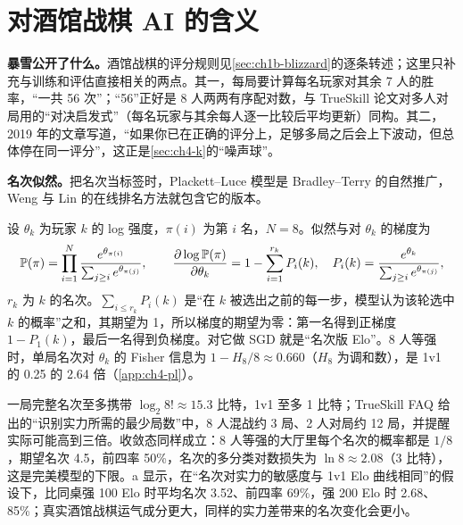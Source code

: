 \section{对酒馆战棋 AI 的含义}
\label{sec:ch4-bg}

\textbf{暴雪公开了什么。}酒馆战棋的评分规则见\cref{sec:ch1b-blizzard}的逐条转述；这里只补充与训练和评估直接相关的两点。其一，每局要计算每名玩家对其余 7 人的胜率，“一共 56 次”\cite{blizzard2019developer}\tagOff；“56”正好是 8 人两两有序配对数，与 TrueSkill 论文对多人对局用的“对决启发式”（每名玩家与其余每人逐一比较后平均更新）同构\cite{herbrich2006trueskill}\tagLit。其二，2019 年的文章写道，“如果你已在正确的评分上，足够多局之后会上下波动，但总体停在同一评分”\cite{blizzard2019developer}\tagOff，这正是\cref{sec:ch4-k}的“噪声球”。

\textbf{名次似然。}把名次当标签时，Plackett–Luce 模型\cite{plackett1975analysis}是 Bradley–Terry 的自然推广，Weng 与 Lin 的在线排名方法就包含它的版本\cite{weng2011bayesian}\tagLit。

\begin{derivbox}
设 $\theta_k$ 为玩家 $k$ 的 log 强度，$\pi(i)$ 为第 $i$ 名，$N=8$。似然与对 $\theta_k$ 的梯度为
\begin{equation}
\mathbb{P}(\pi)=\prod_{i=1}^{N}\frac{e^{\theta_{\pi(i)}}}{\sum_{j\ge i}e^{\theta_{\pi(j)}}},\qquad
\frac{\partial\log\mathbb{P}(\pi)}{\partial\theta_k}=1-\sum_{i=1}^{r_k}P_i(k),\quad P_i(k)=\frac{e^{\theta_k}}{\sum_{j\ge i}e^{\theta_{\pi(j)}}},
\label{eq:ch4-pl}
\end{equation}
$r_k$ 为 $k$ 的名次。$\sum_{i\le r_k}P_i(k)$ 是“在 $k$ 被选出之前的每一步，模型认为该轮选中 $k$ 的概率”之和，其期望为 1，所以梯度的期望为零：第一名得到正梯度 $1-P_1(k)$，最后一名得到负梯度。对它做 SGD 就是“名次版 Elo”。8 人等强时，单局名次对 $\theta_k$ 的 Fisher 信息为 $1-H_8/8\approx0.660$（$H_8$ 为调和数），是 1v1 的 0.25 的 2.64 倍（\cref{app:ch4-pl}）\tagOwn。
\end{derivbox}

一局完整名次至多携带 $\log_2 8!\approx15.3$ 比特，1v1 至多 1 比特；TrueSkill FAQ 给出的“识别实力所需的最少局数”中，8 人混战约 3 局、2 人对局约 12 局，并提醒实际可能高到三倍\cite{microsoft2005trueskill}\tagOff。收敛态同样成立：8 人等强的大厅里每个名次的概率都是 $1/8$，期望名次 4.5，前四率 50\%，名次的多分类对数损失为 $\ln8\approx2.08$（3 比特），这是完美模型的下限\tagOwn。a 显示，在“名次对实力的敏感度与 1v1 Elo 曲线相同”的假设下，比同桌强 100 Elo 时平均名次 3.52、前四率 69\%，强 200 Elo 时 2.68、85\%；真实酒馆战棋运气成分更大，同样的实力差带来的名次变化会更小。

